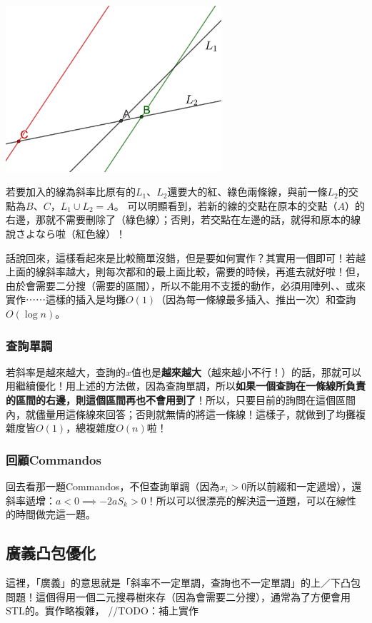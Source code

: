 			\begin{center}
\includegraphics*[width = 0.6\textwidth]{images/bothdandiao_lines.png}
			\end{center}
			若要加入的線為斜率比原有的$L_1$、$L_2$還要大的紅、綠色兩條線，與前一條$L_2$的交點為$B$、$C$，$L_1 \cup L_2 = A$。 可以明顯看到，若新的線的交點在原本的交點（$A$）的右邊，那就不需要刪除了（綠色線）；否則，若交點在左邊的話，就得和原本的線說さよなら啦（紅色線）！
			
			話說回來，這樣看起來是比較簡單沒錯，但是要如何實作？其實用一個即可！若越上面的線斜率越大，則每次都和的最上面比較，需要的時候，再進去就好啦！但，由於會需要二分搜（需要的區間），所以不能用不支援的動作，必須用陣列、、或來實作⋯⋯這樣的插入是均攤$O(1)$（因為每一條線最多插入、推出一次）和查詢$O(\log n)$。
		\subsubsection{查詢單調}
			若斜率是越來越大，查詢的$x$值也是\textbf{越來越大}（越來越小不行！）的話，那就可以用繼續優化！用上述的方法做，因為查詢單調，所以\textbf{如果一個查詢在一條線所負責的區間的右邊，則這個區間再也不會用到了}！所以，只要目前的詢問在這個區間內，就儘量用這條線來回答；否則就無情的將這一條線！這樣子，就做到了均攤複雜度皆$O(1)$，總複雜度$O(n)$啦！
		\subsubsection{回顧Commandos}
			回去看那一題Commandos，不但查詢單調（因為$x_i > 0$所以前綴和一定遞增），還斜率遞增：$a < 0 \implies -2aS_{k} > 0$！所以可以很漂亮的解決這一道題，可以在線性的時間做完這一題。
	\subsection{廣義凸包優化}
		這裡，「廣義」的意思就是「斜率不一定單調，查詢也不一定單調」的上／下凸包問題！這個得用一個二元搜尋樹來存（因為會需要二分搜），通常為了方便會用STL的。實作略複雜，
		//TODO：補上實作
